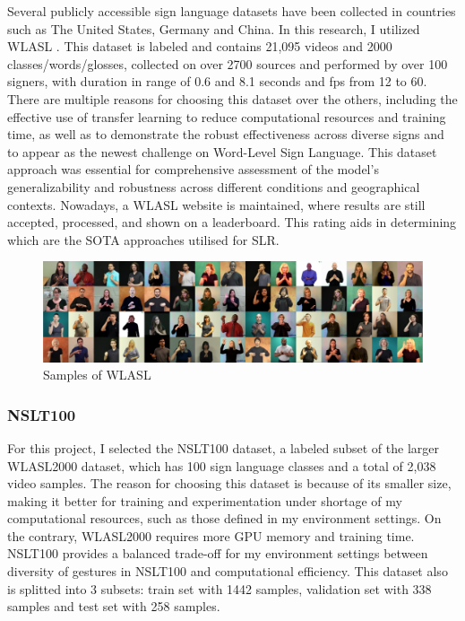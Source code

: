 \documentclass{article}
\begin{document}
Several publicly accessible sign language datasets have been collected in countries such as The United States, Germany and China. In this research, I utilized WLASL \cite{li2020wlasl}. This dataset is labeled and contains 21,095 videos and 2000 classes/words/glosses, collected on over 2700 sources and performed by over 100 signers, with duration in range of 0.6 and 8.1 seconds and fps from 12 to 60. There are multiple reasons for choosing this dataset over the others, including the effective use of transfer learning to reduce  computational resources and training time, as well as to demonstrate the robust effectiveness across diverse signs and to appear as the newest challenge on Word-Level Sign Language. This dataset approach was essential for comprehensive assessment of the model’s generalizability and robustness across different conditions and geographical contexts. Nowadays, a WLASL website \cite{paperswithcode_wlasl2000} is maintained, where results are still accepted, processed, and shown on a leaderboard. This rating aids in determining which are the SOTA approaches utilised for SLR.

\begin{figure}[H]
    \centering
    \includegraphics[width=1\linewidth]{Fig/4row.pdf}
    \caption{Samples of WLASL}
    \label{fig:wlasl}
\end{figure}

\subsubsection{NSLT100}

For this project, I selected the NSLT100 dataset, a labeled subset of the larger WLASL2000 dataset, which has 100 sign language classes and a total of 2,038 video samples. The reason for choosing this dataset is because of its smaller size, making it better for training and experimentation under shortage of my computational resources, such as those defined in my environment settings. On the contrary, WLASL2000 requires more GPU memory and training time. NSLT100 provides a balanced trade-off for my environment settings between diversity of gestures in NSLT100 and computational efficiency. This dataset also is splitted into 3 subsets: train set with 1442 samples, validation set with 338 samples and test set with 258 samples.
\end{document}
